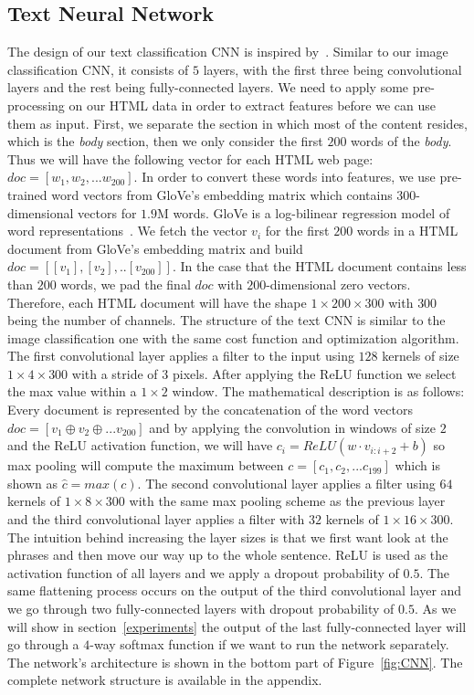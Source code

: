 \documentclass{article} %
\begin{document}
\subsection{Text Neural Network}
\label{sec:textcnn}
The design of our text classification CNN is inspired by~\cite{convtext}. Similar to our image classification CNN, it consists of $5$ layers, with the first three being convolutional layers and the rest being fully-connected layers. We need to apply some pre-processing on our HTML data in order to extract features before we can use them as input. First, we separate the section in which most of the content resides, which is the \textit{body} section, then we only consider the first $200$ words of the \textit{body}. Thus we will have the following vector for each HTML web page: $doc=[w_1,w_2,...w_{200}]$. In order to convert these words into features, we use pre-trained word vectors from GloVe's embedding matrix which contains 300-dimensional vectors for $1.9$M words. GloVe is a log-bilinear regression model of word representations~\cite{glove}. We fetch the vector $v_i$ for the first $200$ words in a HTML document from GloVe's embedding matrix and build $doc = [[v_1],[v_2],..[v_{200}]]$. In the case that the HTML document contains less than $200$ words, we pad the final $doc$ with $200$-dimensional zero vectors. Therefore, each HTML document will have the shape $1\times200\times300$ with $300$ being the number of channels. The structure of the text CNN is similar to the image classification one with the same cost function and optimization algorithm. The first convolutional layer applies a filter to the input using $128$ kernels of size $1\times4\times300$ with a stride of $3$ pixels. After applying the ReLU function we select the max value within a $1\times2$ window. The mathematical description is as follows:\\
Every document is represented by the concatenation of the word vectors $doc = [v_1 \oplus v_2 \oplus ... v_{200}]$ and by applying the convolution in windows of size $2$ and the ReLU activation function, we will have $c_i = ReLU(w\cdot v_{i:i+2} +b)$ so max pooling will compute the maximum between $c = [c_1, c_2, ... c_{199}]$ which is shown as $\hat{c} = max(c)$.
The second convolutional layer applies a filter using $64$ kernels of $1\times8\times300$ with the same max pooling scheme as the previous layer and the third convolutional layer applies a filter with $32$ kernels of $1\times16\times300$. The intuition behind increasing the layer sizes is that we first want look at the phrases and then move our way up to the whole sentence. ReLU is used as the activation function of all layers and we apply a dropout probability of $0.5$. The same flattening process occurs on the output of the third convolutional layer and we go through two fully-connected layers with dropout probability of $0.5$. As we will show in section~\ref{experiments} the output of the last fully-connected layer will go through a $4$-way softmax function if we want to run the network separately. The network's architecture is shown in the bottom part of Figure~\ref{fig:CNN}. The complete network structure is available in the appendix.
\end{document}
